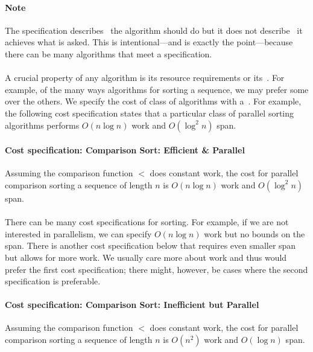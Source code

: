 \paragraph{Note}
The specification describes~ the algorithm should do but it
does not describe~ it achieves what is asked.
%
This is intentional---and is exactly the point---because there can be
many algorithms that meet a specification.
%

\paragraph{}
A crucial property of any algorithm is its resource requirements or
its~.
%
For example, of the many ways algorithms for sorting a sequence, we
may prefer some over the others.  
%
We specify the cost of class of algorithms with a~.  For example, the following cost specification
states that a particular class of parallel sorting algorithms performs
$O(n \log{n})$ work and $O(\log^2{n})$ span.

\paragraph{Cost specification: Comparison Sort: Efficient \& Parallel}
Assuming the comparison function $<$ does constant work, the cost for
parallel comparison sorting a sequence of length $n$ is $O(n \log n)$
work and $O(\log^2 n)$ span.

\paragraph{}
There can be many cost specifications for sorting.  For example, if we
are not interested in parallelism, we can specify $O(n \log{n})$ work
but no bounds on the span. There is another cost specification below
that requires even smaller span but allows for more work.
%
We usually care more about work and thus would prefer the first cost
specification; there might, however, be cases where the second
specification is preferable.

\paragraph{Cost specification: Comparison Sort: Inefficient but Parallel}
Assuming the comparison function $<$ does constant work, the cost for
parallel comparison sorting a sequence of length $n$ is $O(n^2)$ work
and $O(\log n)$ span.

